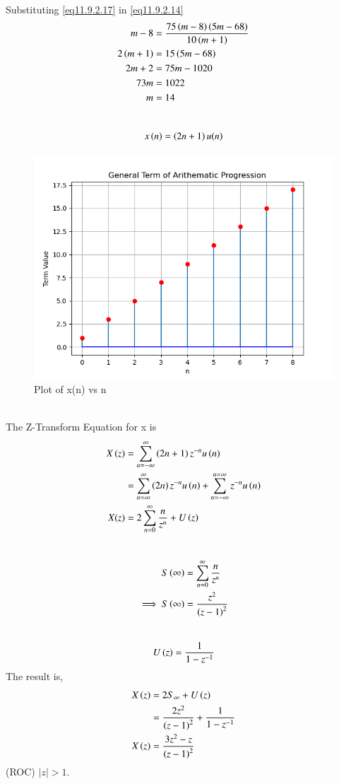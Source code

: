 \documentclass[journal,12pt,twocolumn]{IEEEtran}
\theoremstyle{remark}
\begin{document}
Substituting \eqref{eq11.9.2.17} in \eqref{eq11.9.2.14}\\
 \begin{align}
    m-8&=\frac{75\left(m-8\right)\left(5m-68\right)}{10\left(m+1\right)}\\
    2\left(m+1\right)&=15\left(5m-68\right)\\
    2m+2&=75m-1020\\
    73m&=1022\\
    m&=14
 \end{align}\newpage
  \\
\begin{align}
    x\left(n\right)=\left(2n+1\right)u(n)
\end{align}
\begin{figure}[!h]
    \centering
    \includegraphics[width=1.0\linewidth]{test.png}
    \caption{Plot of x(n) vs n}
    \label{fig:1}
\end{figure}\\
The Z-Transform Equation for x is\\
\begin{align}
    X\left(z\right)&=\sum_{n=-\infty}^{\infty}\left(2n+1\right)z^{-n}u\left(n\right) \\ &=\sum_{n=\infty}^{\infty}\left(2n\right)z^{-n}u\left(n\right) +\sum_{n=-\infty}^{n=\infty}z^{-n}u\left(n\right)\\
    X(z)&=2\sum_{n=0}^{\infty}\dfrac{n}{z^{n}}+U\left(z\right)
\end{align}
\\
\begin{align}
   S\left(\infty\right)&=\sum_{n=0}^{\infty}\dfrac{n}{z^{n}}\\
   \implies S\left(\infty\right)&=\dfrac{z^2}{\left(z-1\right)^{2}}
\end{align}
\\
\begin{align}
   U\left(z\right)=\dfrac{1}{1-z^{-1}}
\end{align}
The result is,
\begin{align}
    X\left(z\right)&=2S_\infty+U\left(z\right)\\
    &=\dfrac{2z^2}{\left(z-1\right)^{2}}+\dfrac{1}{1-z^{-1}}\\
    X\left(z\right)&=\dfrac{3z^2-z}{\left(z-1\right)^{2}}
\end{align}
(ROC) \(|z| > 1\).\\
\end{document}
